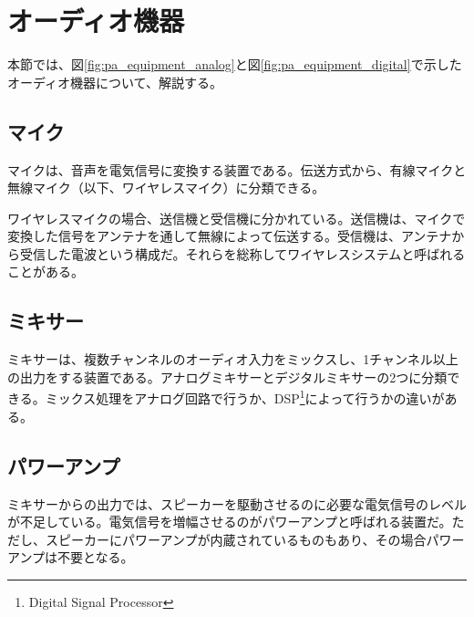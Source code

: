 \section{オーディオ機器}

本節では、図\ref{fig:pa_equipment_analog}と図\ref{fig:pa_equipment_digital}で示したオーディオ機器について、解説する。

\subsection{マイク}

マイクは、音声を電気信号に変換する装置である。伝送方式から、有線マイクと無線マイク（以下、ワイヤレスマイク）に分類できる。

ワイヤレスマイクの場合、送信機と受信機に分かれている。送信機は、マイクで変換した信号をアンテナを通して無線によって伝送する。受信機は、アンテナから受信した電波という構成だ。それらを総称してワイヤレスシステムと呼ばれることがある。


\subsection{ミキサー}

ミキサーは、複数チャンネルのオーディオ入力をミックスし、1チャンネル以上の出力をする装置である。アナログミキサーとデジタルミキサーの2つに分類できる。ミックス処理をアナログ回路で行うか、DSP\footnote{Digital Signal Processor}によって行うかの違いがある。


\subsection{パワーアンプ}

ミキサーからの出力では、スピーカーを駆動させるのに必要な電気信号のレベルが不足している。電気信号を増幅させるのがパワーアンプと呼ばれる装置だ。ただし、スピーカーにパワーアンプが内蔵されているものもあり、その場合パワーアンプは不要となる。



